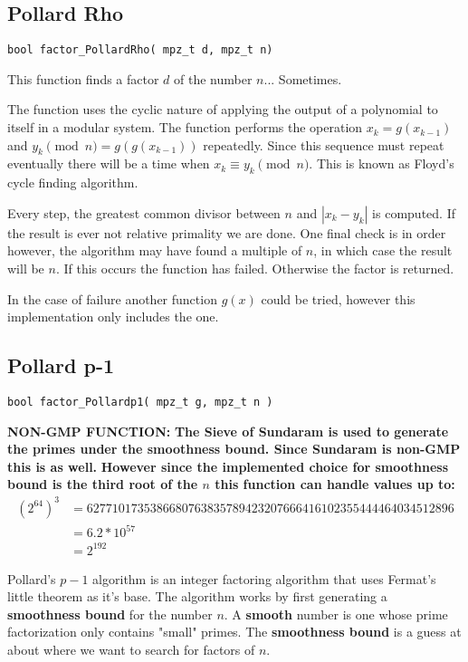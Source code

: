 \subsection{Pollard Rho}
\begin{verbatim}
bool factor_PollardRho( mpz_t d, mpz_t n)
\end{verbatim}

This function finds a factor $d$ of the number $n$... Sometimes.

The function uses the cyclic nature of applying the output of a polynomial to itself in a modular system.
The function performs the operation $x_{k} = g(x_{k-1})$  and $y_{k} \pmod n  = g(g(x_{k-1}))$ repeatedly.
Since this sequence must repeat eventually there will be a time when $x_k \equiv y_k \pmod n$.
This is known as Floyd's cycle finding algorithm.

Every step, the greatest common divisor between $n$ and $|x_k-y_k|$ is computed. 
If the result is ever not relative primality we are done.
One final check is in order however, the algorithm may have found a multiple of $n$, in which case the result will be $n$.
If this occurs the function has failed.
Otherwise the factor is returned.

In the case of failure another function $g(x)$ could be tried, however this implementation only includes the one.


\subsection{Pollard p-1}
\begin{verbatim}
bool factor_Pollardp1( mpz_t g, mpz_t n )
\end{verbatim}
\textbf{ NON-GMP FUNCTION:}
\textbf{ The Sieve of Sundaram is used to generate the primes under the smoothness bound. Since Sundaram is non-GMP this is as well.} 
{\bf However since the implemented choice for smoothness bound is the third root of the $n$ this function can handle values up to:
\begin{align*}
(2^{64})^3 &= 6277101735386680763835789423207666416102355444464034512896 \\
&= 6.2 * 10^{57}\\
&= 2^{192} 
\end{align*}
}

Pollard's $p-1$ algorithm is an integer factoring algorithm that uses Fermat's little theorem as it's base.
The algorithm works by first generating a \textbf{smoothness bound} for the number $n$. 
A \textbf{smooth} number is one whose prime factorization only contains "small" primes.
The \textbf{smoothness bound} is a guess at about where we want to search for factors of $n$.


